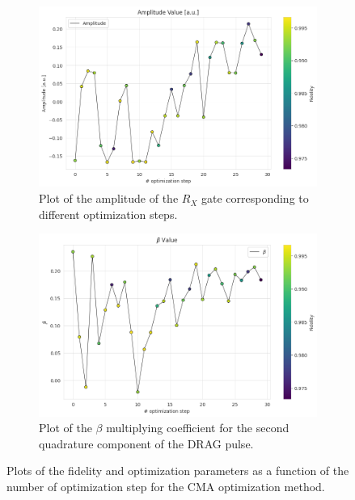 \begin{figure}[h]
    \begin{subfigure}[t]{0.45\textwidth}
        \includegraphics[width=\textwidth]{figures/png/RB_optimization/CMA/CMA_amplitude.png}
        \caption{Plot of the amplitude of the $R_X$ gate corresponding to different optimization steps.}
        \label{fig:CMA:amplitude}
    \end{subfigure}
    \hfill
    \begin{subfigure}[t]{0.45\textwidth}
        \includegraphics[width=\textwidth]{figures/png/RB_optimization/CMA/beta_CMA.png}
        \caption{Plot of the $\beta$ multiplying coefficient for the second quadrature component of the DRAG pulse.}
        \label{fig:CMA:beta}
    \end{subfigure}

    \caption{Plots of the fidelity and optimization parameters as a function of the number of optimization step for the CMA optimization method.}
    \label{fig:CMA_plots}
\end{figure}

